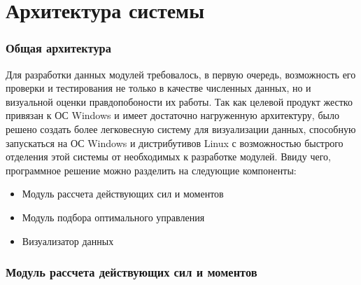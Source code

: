 \chapter{Архитектура системы}
\subsection{Общая архитектура}
\noindent\indent Для разработки данных модулей требовалось, в первую очередь,
возможность его проверки и тестирования не только в качестве численных данных, но
и визуальной оценки правдопобоности их работы. Так как целевой продукт жестко привязан
к ОС Windows и имеет достаточно нагруженную архитектуру, было решено создать более
легковесную систему для визуализации данных, способную запускаться на ОС Windows и
дистрибутивов Linux с возможностью быстрого отделения этой системы от необходимых
к разработке модулей.
Ввиду чего, программное решение можно разделить на следующие компоненты:
\begin{itemize}
  \item Модуль рассчета действующих сил и моментов
  \item Модуль подбора оптимального управления
  \item Визуализатор данных
\end{itemize}
\subsection{Модуль рассчета действующих сил и моментов}
\noindent\indent 
